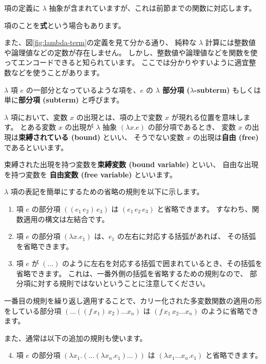 項の定義に $\lambda$ 抽象が含まれていますが、これは前節までの関数に対応します。

項のことを\textbf{式}という場合もあります。

また、図\ref{fig:lambda-term}の定義を見て分かる通り、
純粋な $\lambda$ 計算には整数値や論理値などの定数が存在しません。
しかし、整数値や論理値などを関数を使ってエンコードできると知られています。
ここでは分かりやすいように適宜整数などを使うことがあります。

$\lambda$ 項 $e$ の一部分となっているような項を、$e$ の
\textbf{$\lambda$ 部分項 ($\lambda$-subterm)} もしくは単に\textbf{部分項 (subterm)} と呼びます。

$\lambda$ 項において、変数 $x$ の出現とは、項の上で変数 $x$ が現れる位置を意味します。
とある変数 $x$ の出現が $\lambda$ 抽象 $(\lambda x . e)$ の部分項であるとき、
変数 $x$ の出現は\textbf{束縛されている (bound)} といい、
そうでない変数 $x$ の出現は\textbf{自由 (free)} であるといいます。

束縛された出現を持つ変数を\textbf{束縛変数 (bound variable)} といい、
自由な出現を持つ変数を \textbf{自由変数 (free variable)} といいます。

$\lambda$ 項の表記を簡単にするための省略の規則を以下に示します。

\begin{enumerate}
  \item 項 $e$ の部分項 $((e_1 \, e_2) \, e_3)$ は $(e_1 \, e_2 \, e_3)$ と省略できます。
        すなわち、関数適用の構文は左結合です。
  \item 項 $e$ の部分項 $(\lambda x . e_1)$ は、$e_1$ の左右に対応する括弧があれば、
        その括弧を省略できます。
  \item 項 $e$ が $(\dots)$ のように左右を対応する括弧で囲まれているとき、その括弧を省略できます。
        これは、一番外側の括弧を省略するための規則なので、
        部分項に対する規則ではないということに注意してください。
\end{enumerate}

一番目の規則を繰り返し適用することで、カリー化された多変数関数の適用の形をしている部分項
$(\dots((f \, x_1) \, x_2) \dots x_n)$ は $(f \, x_1 \, x_2 \dots x_n)$ のように省略できます。

また、通常は以下の追加の規則も使います。

\begin{enumerate}
  \setcounter{enumi}{3}
  \item 項 $e$ の部分項 $(\lambda x_1. (\dots (\lambda x_n . e_1) \dots))$ は
        $(\lambda x_1 \dots x_n . e_1)$ と省略できます。
\end{enumerate}

